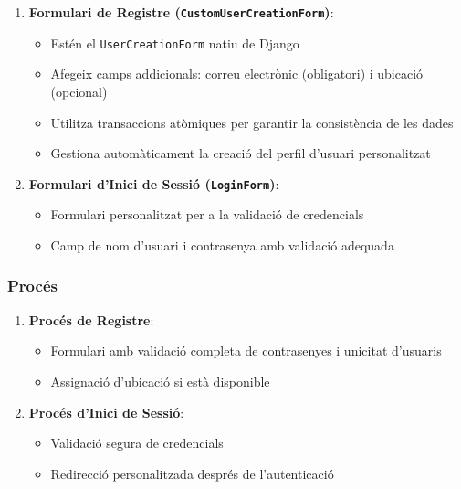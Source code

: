 \begin{enumerate}
\def\labelenumi{\arabic{enumi}.}
\tightlist
\item
  \textbf{Formulari de Registre (\texttt{CustomUserCreationForm})}:

  \begin{itemize}
  \tightlist
  \item
    Estén el \texttt{UserCreationForm} natiu de Django
  \item
    Afegeix camps addicionals: correu electrònic (obligatori) i ubicació
    (opcional)
  \item
    Utilitza transaccions atòmiques per garantir la consistència de les
    dades
  \item
    Gestiona automàticament la creació del perfil d'usuari personalitzat
  \end{itemize}
\item
  \textbf{Formulari d'Inici de Sessió (\texttt{LoginForm})}:

  \begin{itemize}
  \tightlist
  \item
    Formulari personalitzat per a la validació de credencials
  \item
    Camp de nom d'usuari i contrasenya amb validació adequada
  \end{itemize}
\end{enumerate}

\hypertarget{procuxe9s}{%
\subsubsection{Procés}\label{procuxe9s}}

\begin{enumerate}
\def\labelenumi{\arabic{enumi}.}
\tightlist
\item
  \textbf{Procés de Registre}:

  \begin{itemize}
  \item
    Formulari amb validació completa de contrasenyes i unicitat
    d'usuaris
  \item
    Assignació d'ubicació si està disponible
  \end{itemize}
\item
  \textbf{Procés d'Inici de Sessió}:

  \begin{itemize}
  \tightlist
  \item
    Validació segura de credencials
  \item
    Redirecció personalitzada després de l'autenticació
  \end{itemize}
\end{enumerate}

